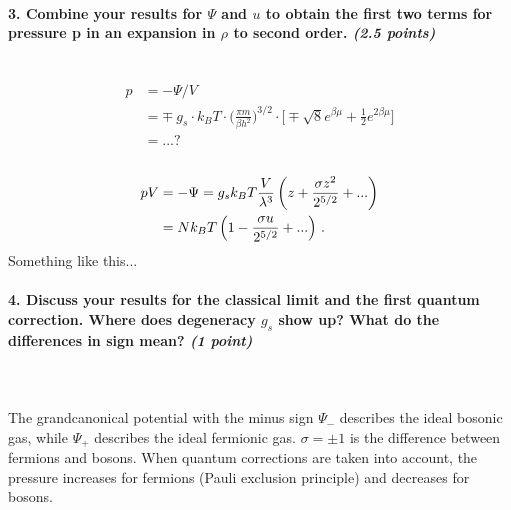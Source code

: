 \paragraph{3. Combine your results for $\Psi$ and $u$ to obtain 
    the first two terms for pressure p in an expansion in 
    $\rho$ to second order. \textit{(2.5 points)}
} \ \\
    \begin{align}
        p
        &=-\Psi/V \\
        &=\mp\ g_s\cdot k_BT\cdot\bigg(
            \frac{\pi m}{\beta h^2}
        \bigg)^{3/2}\cdot\bigg[
            \mp\sqrt{8}e^{\beta\mu}
            +\frac{1}{2}e^{2\beta\mu}
        \bigg] \\
        &=...?
    \end{align}
    \\
    \begin{align}
    pV &= - \Psi = g_s k_B T \frac{V}{\lambda^3} \left(
    z + \frac{\sigma z^2}{2^{5/2}} + ... \right) \notag \\
    &= N k_B T \left( 1-\frac{\sigma u}{2^{5/2}} + ... \right) \,.
    \end{align}
    Something like this...

\paragraph{4. Discuss your results for the classical limit and 
    the first quantum correction. Where does degeneracy $g_s$
    show up? What do the differences in sign mean?
    \textit{(1 point)}
} \ \\
    \\
    The grandcanonical potential with the minus sign 
    $\Psi_-$ describes the ideal bosonic gas, while 
    $\Psi_+$ describes the ideal fermionic gas.
    $\sigma=\pm 1$ is the difference between fermions and bosons.
    When quantum corrections are taken into account, the pressure 
    increases for fermions (Pauli exclusion principle) and decreases
    for bosons.
